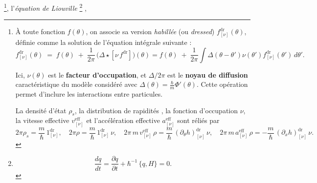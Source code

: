 \footnote{
À toute fonction $f(\theta)$, on associe sa version \emph{habillée} (ou \emph{dressed}) $f^{\mathrm{dr}}_{[\nu]}(\theta)$, définie comme la solution de l’équation intégrale suivante :
\begin{equation}\label{eq:dressing}
    f^{\mathrm{dr}}_{[\nu]}(\theta)
    \;=\; f(\theta) \;+\; \frac{1}{2\pi}\,\bigl(\Delta \star [\nu\, f^{\mathrm{dr}}]\bigr)(\theta) = f(\theta) \;+\; \frac{1}{2\pi} \int \Delta (\theta - \theta') \nu(\theta') f^{\mathrm{dr}}_{[\nu]}(\theta') \, d\theta'  .
\end{equation}

Ici, $\nu(\theta)$ est le \textbf{facteur d’occupation}, et $\Delta/2\pi$ est
le \textbf{noyau de diffusion} caractéristique du modèle considéré avec
$\Delta(\theta) = \frac{\hbar}m \Phi'(\theta)$. Cette opération permet
d'inclure les interactions entre particules.

La densité d'état $\rho_s$, la distribution de rapidités , la fonction
d’occupation $\nu$, la vitesse effective $v^{\mathrm{eff}}_{[\nu]}$ et
l’accélération effective $a^{\mathrm{eff}}_{[\nu]}$ sont réliés par
\begin{equation}\label{chap:GHD:eq.nu.v.a.1}
    2 \pi \rho_s =  \frac{m}{\hbar} \, 1^{\mathrm{dr}}_{[\nu]}  ,
    \quad
    2 \pi \rho =  \frac{m}{\hbar} \, 1^{\mathrm{dr}}_{[\nu]} \, \nu ,
    \quad 2 \pi \, m \, v^{\mathrm{eff}}_{[\nu]} \, \rho  = \frac{m}{\hbar} \, (\partial_\theta h )^{\mathrm{dr}}_{[\nu]} \, \nu ,
    \quad 2 \pi \, m \, a^{\mathrm{eff}}_{[\nu]} \, \rho  = -\frac{m}{\hbar} \, (\partial_x h )^{\mathrm{dr}}_{[\nu]}\, \nu .
\end{equation}
},
l’{\em équation de Liouville}
\footnote{
    \begin{equation}\label{chap:GHD:eq.Liouv.1}
        \frac{d q}{dt}
        = \frac{\partial q}{\partial t } + \hbar^{-1} \, \{ q , H \} = 0.
    \end{equation}
}
,

